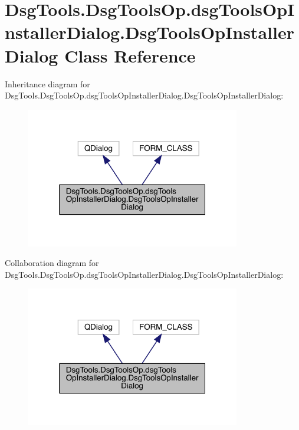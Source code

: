 \hypertarget{class_dsg_tools_1_1_dsg_tools_op_1_1dsg_tools_op_installer_dialog_1_1_dsg_tools_op_installer_dialog}{}\section{Dsg\+Tools.\+Dsg\+Tools\+Op.\+dsg\+Tools\+Op\+Installer\+Dialog.\+Dsg\+Tools\+Op\+Installer\+Dialog Class Reference}
\label{class_dsg_tools_1_1_dsg_tools_op_1_1dsg_tools_op_installer_dialog_1_1_dsg_tools_op_installer_dialog}


Inheritance diagram for Dsg\+Tools.\+Dsg\+Tools\+Op.\+dsg\+Tools\+Op\+Installer\+Dialog.\+Dsg\+Tools\+Op\+Installer\+Dialog\+:
\nopagebreak
\begin{figure}[H]
\begin{center}
\leavevmode
\includegraphics[width=265pt]{class_dsg_tools_1_1_dsg_tools_op_1_1dsg_tools_op_installer_dialog_1_1_dsg_tools_op_installer_dialog__inherit__graph}
\end{center}
\end{figure}


Collaboration diagram for Dsg\+Tools.\+Dsg\+Tools\+Op.\+dsg\+Tools\+Op\+Installer\+Dialog.\+Dsg\+Tools\+Op\+Installer\+Dialog\+:
\nopagebreak
\begin{figure}[H]
\begin{center}
\leavevmode
\includegraphics[width=265pt]{class_dsg_tools_1_1_dsg_tools_op_1_1dsg_tools_op_installer_dialog_1_1_dsg_tools_op_installer_dialog__coll__graph}
\end{center}
\end{figure}
